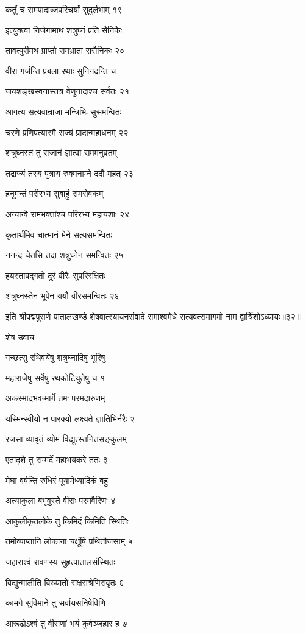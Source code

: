 कर्तुं च रामपादाब्जपरिचर्यां सुदुर्लभाम् १९

इत्युक्त्वा निर्जगामाथ शत्रुघ्नं प्रति सैनिकैः

तावत्पुरीमथ प्राप्तो रामभ्राता ससैनिकः २०

वीरा गर्जन्ति प्रबला रथाः सुनिनदन्ति च

जयशङ्खस्वनास्तत्र वेणुनादाश्च सर्वतः २१

आगत्य सत्यवान्राजा मन्त्रिभिः सुसमन्वितः

चरणे प्रणिपत्यास्मै राज्यं प्रादान्महाधनम् २२

शत्रुघ्नस्तं तु राजानं ज्ञात्वा राममनुव्रतम्

तद्राज्यं तस्य पुत्राय रुक्मनाम्ने ददौ महत् २३

हनूमन्तं परीरभ्य सुबाहुं रामसेवकम्

अन्यान्वै रामभक्तांश्च परिरभ्य महायशाः २४

कृतार्थमिव चात्मानं मेने सत्यसमन्वितः

ननन्द चेतसि तदा शत्रुघ्नेन समन्वितः २५

हयस्तावद्गतो दूरं वीरैः सुपरिरक्षितः

शत्रुघ्नस्तेन भूपेन ययौ वीरसमन्वितः २६

इति श्रीपद्मपुराणे पातालखण्डे शेषवात्स्यायनसंवादे रामाश्वमेधे सत्यवत्समागमो नाम द्वात्रिंशोऽध्यायः॥३२॥


शेष उवाच

गच्छत्सु रथिवर्येषु शत्रुघ्नादिषु भूरिषु

महाराजेषु सर्वेषु रथकोटियुतेषु च १

अकस्मादभवन्मार्गे तमः परमदारुणम्

यस्मिन्स्वीयो न पारक्यो लक्ष्यते ज्ञातिभिर्नरैः २

रजसा व्यावृतं व्योम विद्युत्स्तनितसङ्कुलम्

एतादृशे तु सम्मर्दे महाभयकरे ततः ३

मेघा वर्षन्ति रुधिरं पूयामेध्यादिकं बहु

अत्याकुला बभूवुस्ते वीराः परमवैरिणः ४

आकुलीकृतलोके तु किमिदं किमिति स्थितिः

तमोव्याप्तानि लोकानां चक्षूंषि प्रथितौजसाम् ५

जहाराश्वं रावणस्य सुहृत्पातालसंस्थितः

विद्युन्मालीति विख्यातो राक्षसश्रेणिसंवृतः ६

कामगे सुविमाने तु सर्वायसनिषेविणि

आरूढोऽश्वं तु वीराणां भयं कुर्वञ्जहार ह ७

